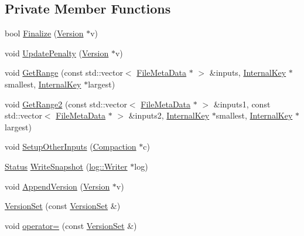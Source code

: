 \subsection*{Private Member Functions}
\begin{DoxyCompactItemize}
\item 
bool \hyperlink{classleveldb_1_1_version_set_ada66d8ea6e0671379432616155217440}{Finalize} (\hyperlink{classleveldb_1_1_version}{Version} $\ast$v)
\item 
void \hyperlink{classleveldb_1_1_version_set_a983d2b907b0be034c476339f968c7645}{Update\+Penalty} (\hyperlink{classleveldb_1_1_version}{Version} $\ast$v)
\item 
void \hyperlink{classleveldb_1_1_version_set_a4bba8e7761e985933a27ad44ec98f70d}{Get\+Range} (const std\+::vector$<$ \hyperlink{structleveldb_1_1_file_meta_data}{File\+Meta\+Data} $\ast$ $>$ \&inputs, \hyperlink{classleveldb_1_1_internal_key}{Internal\+Key} $\ast$smallest, \hyperlink{classleveldb_1_1_internal_key}{Internal\+Key} $\ast$largest)
\item 
void \hyperlink{classleveldb_1_1_version_set_a558c8e10dd7c19c0354cf2721560840b}{Get\+Range2} (const std\+::vector$<$ \hyperlink{structleveldb_1_1_file_meta_data}{File\+Meta\+Data} $\ast$ $>$ \&inputs1, const std\+::vector$<$ \hyperlink{structleveldb_1_1_file_meta_data}{File\+Meta\+Data} $\ast$ $>$ \&inputs2, \hyperlink{classleveldb_1_1_internal_key}{Internal\+Key} $\ast$smallest, \hyperlink{classleveldb_1_1_internal_key}{Internal\+Key} $\ast$largest)
\item 
void \hyperlink{classleveldb_1_1_version_set_aa9230d35e8bf13fc2f9b30f2a96f5c8a}{Setup\+Other\+Inputs} (\hyperlink{classleveldb_1_1_compaction}{Compaction} $\ast$c)
\item 
\hyperlink{classleveldb_1_1_status}{Status} \hyperlink{classleveldb_1_1_version_set_a0363416d0bee83bb1558837c1dd90830}{Write\+Snapshot} (\hyperlink{classleveldb_1_1log_1_1_writer}{log\+::\+Writer} $\ast$log)
\item 
void \hyperlink{classleveldb_1_1_version_set_aaed50532d8db6fe5941098c3462b24b8}{Append\+Version} (\hyperlink{classleveldb_1_1_version}{Version} $\ast$v)
\item 
\hyperlink{classleveldb_1_1_version_set_a0092350bf92a74ddff7b40faf2a3f214}{Version\+Set} (const \hyperlink{classleveldb_1_1_version_set}{Version\+Set} \&)
\item 
void \hyperlink{classleveldb_1_1_version_set_ad8bc71a204e00f1950ddaec6d3934877}{operator=} (const \hyperlink{classleveldb_1_1_version_set}{Version\+Set} \&)
\end{DoxyCompactItemize}
